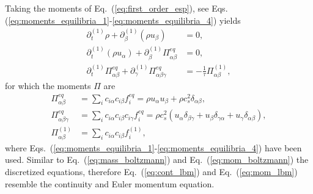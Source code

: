 Taking the moments of Eq.~(\ref{eq:first_order_esp}), see Eqs.(\ref{eq:moments_equilibria_1}-\ref{eq:moments_equilibria_4}) yields
\begin{align}
    \partial_t^{(1)}\rho + \partial_{\beta}^{(1)}(\rho u_{\beta}) &= 0, \label{eq:cont_lbm}\\
    \partial_t^{(1)}(\rho u_{\alpha}) + \partial_{\beta}^{(1)}\Pi^{eq}_{\alpha\beta} &= 0, \label{eq:mom_lbm}\\
    \partial_t^{(1)}\Pi^{eq}_{\alpha\beta} + \partial_{\gamma}^{(1)}\Pi^{eq}_{\alpha\beta\gamma} &= -\frac{1}{\tau}\Pi^{(1)}_{\alpha\beta}, \label{eq:energy_lbm}
\end{align}
for which the moments $\Pi$ are
\begin{align}
    \Pi^{eq}_{\alpha\beta} &= \sum_{i}c_{i\alpha} c_{i\beta} f_{i}^{eq} = \rho u_{\alpha} u_{\beta} + \rho c_s^2\delta_{\alpha\beta}, \label{eq:Pi_lbm_1}\\
    \Pi^{eq}_{\alpha\beta\gamma} &= \sum_{i}c_{i\alpha} c_{i\beta} c_{i\gamma} f_{i}^{eq} = \rho c_s^2(u_{\alpha}\delta_{\beta\gamma} + u_{\beta}\delta_{\gamma\alpha} + u_{\gamma}\delta_{\alpha\beta}), \label{eq:Pi_lbm_2}\\
    \Pi^{(1)}_{\alpha\beta} &= \sum_{i}c_{i\alpha} c_{i\beta} f_{i}^{(1)}, \label{eq:Pi_lbm_3}
\end{align}
where Eqs.~(\ref{eq:moments_equilibria_1}-\ref{eq:moments_equilibria_4}) have been used.
Similar to Eq.~(\ref{eq:mass_boltzmann}) and Eq.~(\ref{eq:mom_boltzmann}) the discretized equations, therefore Eq.~(\ref{eq:cont_lbm}) and Eq.~(\ref{eq:mom_lbm}) resemble the continuity and Euler momentum equation.

